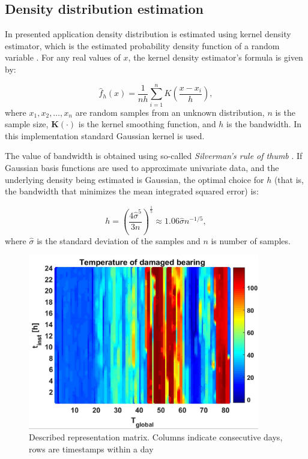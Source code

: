 \documentclass{svproc}
\begin{document}
\subsection{Density distribution estimation}

In presented application density distribution is estimated using kernel density estimator, which is the estimated probability density function of a random variable \cite{peter1985kernel,silverman1986density}. For any real values of $x$, the kernel density estimator's formula is given by:

\begin{equation*}
    \hat{f}_h(x)=\frac{1}{nh} \sum_{i=1}^{n}K\left( \frac{x-x_i}{h}\right),
\end{equation*}
where $x_1, x_2, \dots , x_n$ are random samples from an unknown distribution, $n$ is the sample size, $\mathbf{K(\cdot)}$ is the kernel smoothing function, and $h$ is the bandwidth. In this implementation standard Gaussian kernel is used.

The value of bandwidth is obtained using so-called \emph{Silverman's rule of thumb} \cite{silverman1986density}. If Gaussian basis functions are used to approximate univariate data, and the underlying density being estimated is Gaussian, the optimal choice for $h$ (that is, the bandwidth that minimizes the mean integrated squared error) is:

\begin{equation*}
    h=\left( \frac{4\hat{\sigma}^5}{3n} \right)^{\frac{1}{5}} \approx 1.06\hat{\sigma}n^{-1/5},
\end{equation*}
where $\hat{\sigma}$ is the standard deviation of the samples and $n$ is number of samples.

\begin{figure}[ht!]
\centering
\includegraphics[width=0.9\textwidth]{figs/Fig04.jpg}
\caption{Described representation matrix. Columns indicate consecutive days, rows are timestamps within a day}
\label{fig:map1}
\end{figure}
\end{document}
